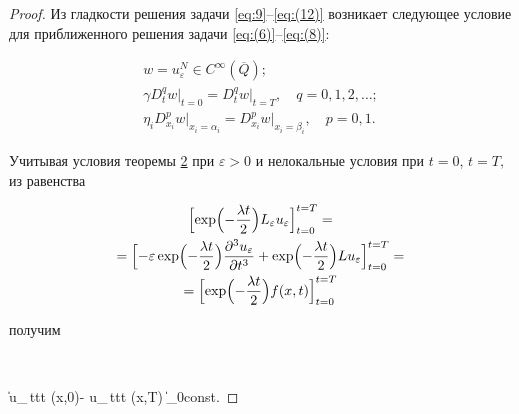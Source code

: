 \begin{proof}

Из гладкости решения задачи \eqref{eq:9}--\eqref{eq:(12)}  возникает  следующее условие для приближенного решения задачи \eqref{eq:(6)}--\eqref{eq:(8)}:

\begin{gather}

w=u _{\varepsilon }^{N}\in C ^{\infty }(\overline{Q});\\

\gamma 

D_{t}^{q} w \bigr|_{t=0} =

D_{t}^{q} w \bigr|_{t=T},\quad  q=0, 1, 2,\dots; \\

\eta _{i} 

D_{x_i}^{p} w \bigr|_{x_i=\alpha _i}=

D_{x_i}^{p} w \bigr|_{x_i=\beta _i}, \quad  p=0, 1.

\end{gather}

Учитывая условия теоремы \hyperlink{dzh:th2}{2} при $\varepsilon >0$ и   нелокальные условия при ${t=0}$, ${t=T},$  из равенства

\begin{multline}

\Bigl[

\exp \Bigl( -\frac{\lambda t}{2}\Bigr) L_\varepsilon  u_\varepsilon  \Bigr]_{t=0}^{t=T}

=

\\

= \Bigl[

-\varepsilon  \exp \Bigl( -\frac{\lambda t}{2}\Bigr) 

\frac{\partial ^3 u_ \varepsilon }{\partial t^3}+

\exp \Bigl( -\frac{\lambda t}{2}\Bigr) L u_\varepsilon 

\Bigr]_{t=0}^{t=T}

=

\\

=\Bigl[

\exp \Bigl(-\frac{\lambda t}{2}\Bigr)  f(x,t) \Bigr]_{t=0}^{t=T}

\end{multline}

получим

$$

\bigl\| 

\gamma u_{\varepsilon \,ttt} (x,0)- u_{\varepsilon \,ttt} (x,T) \bigr\|_{0}\le \rm const.


\end{proof}
